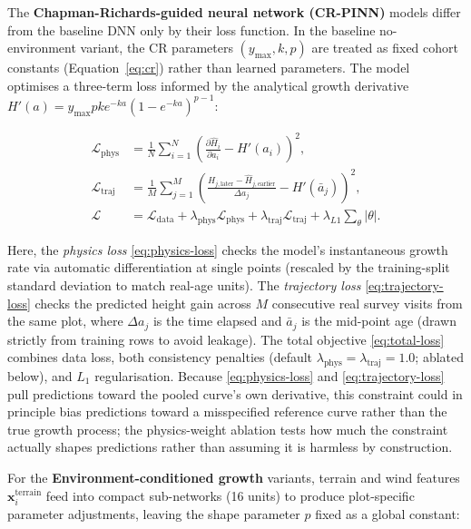 \documentclass[11pt,a4paper]{report}
\begin{document}
The \textbf{Chapman-Richards-guided neural network (CR-PINN)} models differ from the baseline DNN only by their loss function. In the baseline no-environment variant, the CR parameters $(y_{\max}, k, p)$ are treated as fixed cohort constants (Equation~\ref{eq:cr}) rather than learned parameters. The model optimises a three-term loss informed by the analytical growth derivative $H'(a) = y_{\max} p k e^{-ka}(1 - e^{-ka})^{p-1}$:

\begin{subequations}
\label{eq:cr-pinn-losses}
\begin{align}
\mathcal{L}_{\text{phys}} &= \frac{1}{N}\sum_{i=1}^{N}\left(\frac{\partial \hat{H}_i}{\partial a_i} - H'(a_i)\right)^2, \label{eq:physics-loss} \\
\mathcal{L}_{\text{traj}} &= \frac{1}{M}\sum_{j=1}^{M}\left(\frac{\hat{H}_{j,\text{later}} - \hat{H}_{j,\text{earlier}}}{\Delta a_j} - H'(\bar{a}_j)\right)^2, \label{eq:trajectory-loss} \\
\mathcal{L} &= \mathcal{L}_{\text{data}} + \lambda_{\text{phys}}\mathcal{L}_{\text{phys}} + \lambda_{\text{traj}}\mathcal{L}_{\text{traj}} + \lambda_{L1}\sum_{\theta}|\theta|. \label{eq:total-loss}
\end{align}
\end{subequations}

Here, the \emph{physics loss} \eqref{eq:physics-loss} checks the model's instantaneous growth rate via automatic differentiation at single points (rescaled by the training-split standard deviation to match real-age units). The \emph{trajectory loss} \eqref{eq:trajectory-loss} checks the predicted height gain across $M$ consecutive real survey visits from the same plot, where $\Delta a_j$ is the time elapsed and $\bar{a}_j$ is the mid-point age (drawn strictly from training rows to avoid leakage). The total objective \eqref{eq:total-loss} combines data loss, both consistency penalties (default $\lambda_{\text{phys}}=\lambda_{\text{traj}}=1.0$; ablated below), and $L_1$ regularisation. Because \eqref{eq:physics-loss} and \eqref{eq:trajectory-loss} pull predictions toward the pooled curve's own derivative, this constraint could in principle bias predictions toward a misspecified reference curve rather than the true growth process; the physics-weight ablation tests how much the constraint actually shapes predictions rather than assuming it is harmless by construction.

For the \textbf{Environment-conditioned growth} variants, terrain and wind features $\mathbf{x}^{\text{terrain}}_i$ feed into compact sub-networks (16 units) to produce plot-specific parameter adjustments, leaving the shape parameter $p$ fixed as a global constant:
\end{document}
